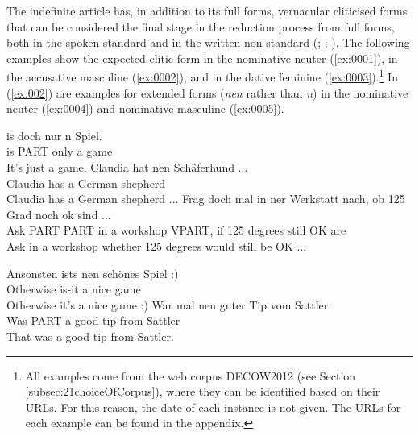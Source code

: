
The indefinite article has, in addition to its full forms, vernacular cliticised forms that can be considered the final stage in the reduction process from full forms, both in the spoken standard and in the written non-standard (\citealt[190]{Eisenberg2013b}; \citealt[19]{Nuebling1992}; \citealt[112]{Nuebling2005}). %
The following examples show the expected clitic form in the nominative neuter (\ref{ex:0001}), in the accusative masculine (\ref{ex:0002}), and in the dative feminine (\ref{ex:0003}).\footnote{All examples come from the web corpus DECOW2012 (see Section \ref{subsec:21choiceOfCorpus}), where they can be identified based on their URLs. For this reason, the date of each instance is not given. The URLs for each example can be found in the appendix.}
In (\ref{ex:002}) are examples for extended forms (\textit{nen} rather than \textit{n}) in the nominative neuter (\ref{ex:0004}) and nominative masculine (\ref{ex:0005}).

\begin{exe}
\ex\label{ex:001}
	\begin{xlist}
	\ex\label{ex:0001}\gll is doch nur n Spiel.\\
	is PART only a game\\
	\trans It's just a game.
	\ex\label{ex:0002}\gll Claudia hat nen {Schäferhund ...}\\
	Claudia has a {German shepherd}\\
	\trans Claudia has a German shepherd ...
	\ex\label{ex:0003}\gll Frag doch mal in ner Werkstatt nach, ob 125 Grad noch ok {sind ...}\\
	Ask PART PART in a workshop VPART, if 125 degrees still OK are\\
	\trans Ask in a workshop whether 125 degrees would still be OK ...
	\end{xlist}
\ex\label{ex:002}
	\begin{xlist}
	\ex\label{ex:0004}\gll Ansonsten ists nen schönes Spiel :)\\
	Otherwise is-it a nice game\\
	\trans Otherwise it's a nice game :)
	\ex\label{ex:0005}\gll War mal nen guter Tip vom Sattler.\\
	Was PART a good tip from Sattler\\
	\trans That was a good tip from Sattler.
	\end{xlist}	
\end{exe}

